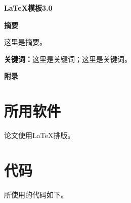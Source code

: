 \documentclass[12pt, a4paper, twoside]{ctexrep}
\renewcommand{\thesection}{\arabic{section}.}
\begin{document}
\pagestyle{empty}
\setcounter{page}{0}

\begin{center}
    \Large{\textbf{\LaTeX 模板3.0}}
\end{center}

\begin{center}
    \Large{\textbf{摘要}}
\end{center}

这里是摘要。

\textbf{关键词：}这里是关键词；这里是关键词。

\newpage
\setcounter{page}{1}
\pagestyle{plain}
\fancyfoot[C]{\thepage}





\newpage
\begin{center}
    \Large{\textbf{附录}}
\end{center}

\begin{appendices}
    \renewcommand{\thesection}{\Alph{section}}
    \section{所用软件}
    论文使用\LaTeX 排版。
    \section{代码}
    所使用的代码如下。
\end{appendices}
\end{document}
